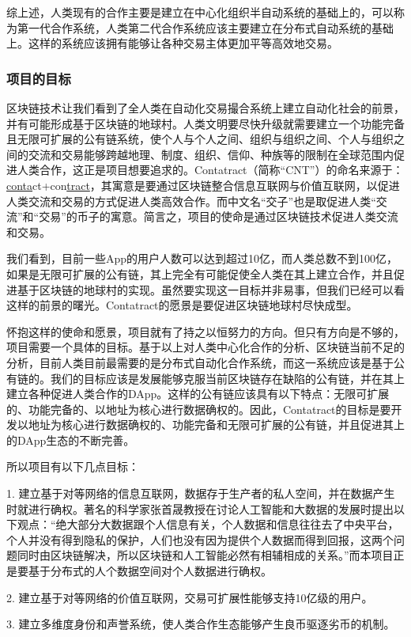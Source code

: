 \documentclass[a4paper,12pt]{article}
\begin{document}
综上述，人类现有的合作主要是建立在中心化组织半自动系统的基础上的，可以称为第一代合作系统，人类第二代合作系统应该主要建立在分布式自动系统的基础上。这样的系统应该拥有能够让各种交易主体更加平等高效地交易。

\subsubsection{项目的目标}
区块链技术让我们看到了全人类在自动化交易撮合系统上建立自动化社会的前景，并有可能形成基于区块链的地球村。人类文明要尽快升级就需要建立一个功能完备且无限可扩展的公有链系统，使个人与个人之间、组织与组织之间、个人与组织之间的交流和交易能够跨越地理、制度、组织、信仰、种族等的限制在全球范围内促进人类合作，这正是项目想要追求的。Contatract（简称“CNT”）的命名来源于：\underline{conta}ct+con\underline{tract}，其寓意是要通过区块链整合信息互联网与价值互联网，以促进人类交流和交易的方式促进人类高效合作。而中文名“交子”也是取促进人类“交流”和“交易”的币子的寓意。简言之，项目的使命是通过区块链技术促进人类交流和交易。

我们看到，目前一些App的用户人数可以达到超过10亿，而人类总数不到100亿，如果是无限可扩展的公有链，其上完全有可能促使全人类在其上建立合作，并且促进基于区块链的地球村的实现。虽然要实现这一目标并非易事，但我们已经可以看这样的前景的曙光。Contatract的愿景是要促进区块链地球村尽快成型。

怀抱这样的使命和愿景，项目就有了持之以恒努力的方向。但只有方向是不够的，项目需要一个具体的目标。基于以上对人类中心化合作的分析、区块链当前不足的分析，目前人类目前最需要的是分布式自动化合作系统，而这一系统应该是基于公有链的。我们的目标应该是发展能够克服当前区块链存在缺陷的公有链，并在其上建立各种促进人类合作的DApp。这样的公有链应该具有以下特点：无限可扩展的、功能完备的、以地址为核心进行数据确权的。因此，Contatract的目标是要开发以地址为核心进行数据确权的、功能完备和无限可扩展的公有链，并且促进其上的DApp生态的不断完善。

所以项目有以下几点目标：

1. 建立基于对等网络的信息互联网，数据存于生产者的私人空间，并在数据产生时就进行确权。著名的科学家张首晟教授在讨论人工智能和大数据的发展时提出以下观点：“绝大部分大数据跟个人信息有关，个人数据和信息往往去了中央平台，个人并没有得到隐私的保护，人们也没有因为提供个人数据而得到回报，这两个问题同时由区块链解决，所以区块链和人工智能必然有相辅相成的关系。”而本项目正是要基于分布式的人个数据空间对个人数据进行确权。

2. 建立基于对等网络的价值互联网，交易可扩展性能够支持10亿级的用户。

3. 建立多维度身份和声誉系统，使人类合作生态能够产生良币驱逐劣币的机制。
\end{document}
